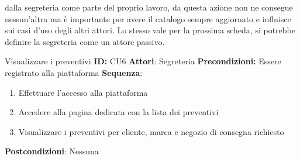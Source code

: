 \documentclass[a4paper, 11pt,oneside,]{book}
\begin{document}
        dalla segreteria come parte del proprio lavoro, da questa azione non ne consegue nessun'altra ma è importante per avere il catalogo sempre
        aggiornato e influisce sui casi d'uso degli altri attori. Lo stesso vale per la prossima scheda, si potrebbe definire la segreteria come un attore passivo.
        \begin{mybox}{Visualizzare i preventivi}
            \textbf{ID:} CU6
            \tcbline
            \textbf{Attori}: Segreteria
            \tcbline
            \textbf{Precondizioni:} Essere registrato alla piattaforma
            \tcbline
            \textbf{Sequenza}: 
                \begin{enumerate}
                    \item Effettuare l'accesso alla piattaforma
                    \item Accedere alla pagina dedicata con la lista dei preventivi
                    \item Visualizzare i preventivi per cliente, marca e negozio di consegna richiesto
                \end{enumerate}
            \tcbline
            \textbf{Postcondizioni}: Nessuna
        \end{mybox}



\end{document}
